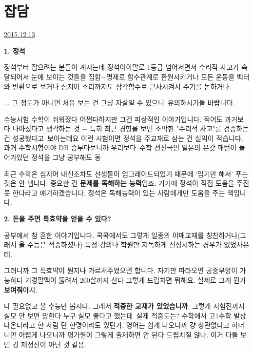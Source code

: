 \section{잡담}
\href{https://www.kockoc.com/Apoc/543390}{2015.12.13}

\vspace{5mm}

\item \textbf{1. 정석}
\vspace{5mm}

정석부터 잡으려는 분들이 계시는데
정석이야말로 1등급 넘어서면서 수리적 사고가 숙달되어서
눈에 보이는 것들을 집합$-$명제로 함수관계로 환원시키거나
모든 운동을 벡터와 변환으로 보거나
심지어 소리까지도 삼각함수로 근사시켜서 주기를 논하거나.
\vspace{5mm}

... 그 정도가 아니면 처음 보는 건 그냥 자살일 수 있으니 유의하시기들 바랍니다.
\vspace{5mm}

수능시험 수학이 쉬워졌다 어쩐다하지만 그건 피상적인 이야기입니다.
적어도 과거보다 나아졌다고 생각하는 것 $-$ 특히 최근 경향을 보면 소박한 "수리적 사고"를 검증하는 건 성공했다고 보이는데요
이런 시험이면 정석을 주교재로 삼는 건 실익이 적습니다.
과거 수학시험이야 DB 승부다보니까 우리보다 수학 선진국인 일본의 온갖 패턴이 들어가있던 정석을 그냥 공부해도 동
\vspace{5mm}

최근 수학은 심지어 내신조차도 선생들이 업그레이드되었기 때문에 '암기만 해서' 푸는 것은 안 냅니다.
중요한 건 \textbf{문제를 독해하는 능력}입죠.
거기에 정석이 직접 도움을 주진 못 한다라고 얘기하겠습니다. 정석은 독해능력이 있는 사람에게만 도움을 주는 책입니다.
\vspace{5mm}

\item \textbf{2. 돈을 주면 특효약을 얻을 수 있다?}
\vspace{5mm}

공부에서 참 흔한 이야기입니다.
콕콕에서도 그렇게 일종의 야매교재를 칭찬하거나(그래서 올 수능은 적중하셨나)
특정 강의나 학원만 지독하게 신성시하는 경우가 있었사온데.
\vspace{5mm}

그러니까 그 특효약이 뭔지나 가르쳐주었으면 합니다.
자기만 따라오면 공중부양이 가능하다 기경팔맥이 뚫려서 200살까지 산다 그렇게 드립치면 뭐해요.
실제로 그게 뭔가 \textbf{보여줘}야지.
\vspace{5mm}

다 필요없고 올 수능만 봅시다. 그래서 \textbf{적중한 교재가 있었습니까}.
그렇게 시험전까지 실모 안 보면 망한다 누구 실모 좋다고 했는데 실제 적중도는?
수학에서 고1수학 발상 나온다라고 한 사람 단 한명이라도 있던가.
영어는 쉽게 나오니까 걍 상관없다고 하더니만 어렵게 나오니까 평가원이 그렇게 출제하면 안 된다 드립치질 않나.
이거 다들 보면 걍 제정신이 아닌 것 같음.
\vspace{5mm}

